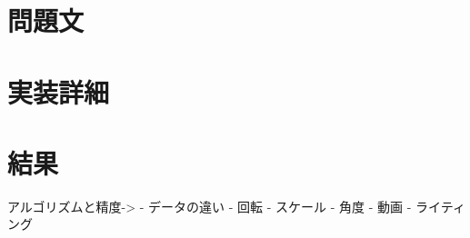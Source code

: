 \section{問題文}
\section{実装詳細}
\section{結果}
アルゴリズムと精度->
    - データの違い
        - 回転
        - スケール
        - 角度
        - 動画
        - ライティング
